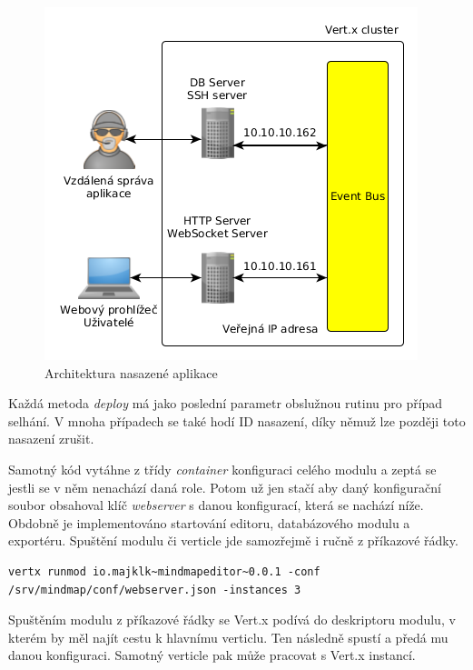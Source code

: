 \begin{figure}
\begin{centering}
\includegraphics[scale=0.5]{obrazky/architecture_real}
\par\end{centering}
\caption{Architektura nasazené aplikace\label{fig:architecture_real}}
\end{figure}

Každá metoda \emph{deploy} má jako poslední parametr obslužnou rutinu pro případ selhání. V mnoha případech se také hodí ID nasazení, díky němuž lze později toto nasazení zrušit.

Samotný kód vytáhne z třídy \emph{container} konfiguraci celého modulu a zeptá se jestli se v něm nenachází daná role. Potom už jen stačí aby daný konfigurační soubor obsahoval klíč \emph{webserver} s danou konfigurací, která se nachází níže. Obdobně je implementováno startování editoru, databázového modulu a exportéru. Spuštění modulu či verticle jde samozřejmě i ručně z příkazové řádky.

\begin{lstlisting}[caption=Spuštění modulu z příkazové řádky]
vertx runmod io.majklk~mindmapeditor~0.0.1 -conf /srv/mindmap/conf/webserver.json -instances 3
\end{lstlisting}

Spuštěním modulu z příkazové řádky se Vert.x podívá do deskriptoru modulu, v kterém by měl najít cestu k hlavnímu verticlu. Ten následně spustí a předá mu danou konfiguraci. Samotný verticle pak může pracovat s Vert.x instancí.

